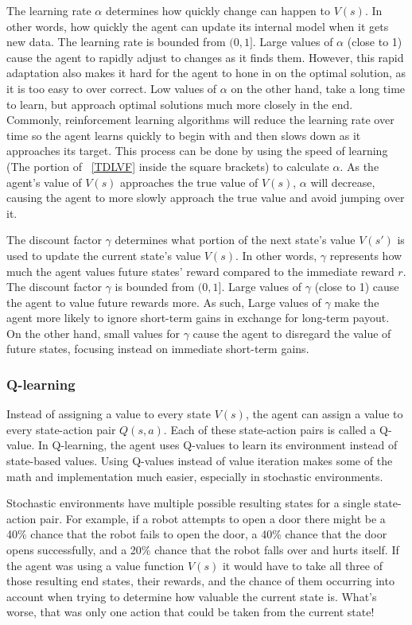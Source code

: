 \documentclass[12pt]{thesis}
\begin{document}
The learning rate $\alpha$ determines how quickly change can happen to $V(s)$. In other words, how quickly the agent can update its internal model when it gets new data. The learning rate is bounded from $(0,1]$. Large values of $\alpha$ (close to 1) cause the agent to rapidly adjust to changes as it finds them. However, this rapid adaptation also makes it hard for the agent to hone in on the optimal solution, as it is too easy to over correct. Low values of $\alpha$ on the other hand, take a long time to learn, but approach optimal solutions much more closely in the end. Commonly, reinforcement learning algorithms will reduce the learning rate over time so the agent learns quickly to begin with and then slows down as it approaches its target. This process can be done by using the speed of learning (The portion of \figurename~\ref{TDLVF} inside the square brackets) to calculate $\alpha$. As the agent's value of $V(s)$ approaches the true value of $V(s)$, $\alpha$ will decrease, causing the agent to more slowly approach the true value and avoid jumping over it.

The discount factor $\gamma$ determines what portion of the next state's value $V(s')$ is used to update the current state's value $V(s)$. In other words, $\gamma$ represents how much the agent values future states' reward compared to the immediate reward $r$. The discount factor $\gamma$ is bounded from $(0,1]$. Large values of $\gamma$ (close to 1) cause the agent to value future rewards more. As such, Large values of $\gamma$ make the agent more likely to ignore short-term gains in exchange for long-term payout. On the other hand, small values for $\gamma$ cause the agent to disregard the value of future states, focusing instead on immediate short-term gains.
\subsubsection{Q-learning}
Instead of assigning a value to every state $V(s)$, the agent can assign a value to every state-action pair $Q(s,a)$. Each of these state-action pairs is called a Q-value. In Q-learning, the agent uses Q-values to learn its environment instead of state-based values. Using Q-values instead of value iteration makes some of the math and implementation much easier, especially in stochastic environments.

Stochastic environments have multiple possible resulting states for a single state-action pair. For example, if a robot attempts to open a door there might be a 40\% chance that the robot fails to open the door, a 40\% chance that the door opens successfully, and a 20\% chance that the robot falls over and hurts itself. If the agent was using a value function $V(s)$ it would have to take all three of those resulting end states, their rewards, and the chance of them occurring into account when trying to determine how valuable the current state is. What's worse, that was only one action that could be taken from the current state!
\end{document}
